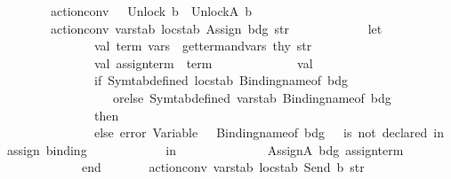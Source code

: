 \begin{isabellebody}
\ \ \ \ \ \ {\isacharbar}{\kern0pt}\ action{\isacharunderscore}{\kern0pt}conv\ {\isacharunderscore}{\kern0pt}\ {\isacharunderscore}{\kern0pt}\ {\isacharparenleft}{\kern0pt}Unlock\ b{\isacharparenright}{\kern0pt}\ {\isacharequal}{\kern0pt}\ UnlockA\ b\isanewline
\ \ \ \ \ \ {\isacharbar}{\kern0pt}\ action{\isacharunderscore}{\kern0pt}conv\ varstab\ locstab\ {\isacharparenleft}{\kern0pt}Assign\ {\isacharparenleft}{\kern0pt}bdg{\isacharcomma}{\kern0pt}\ str{\isacharparenright}{\kern0pt}{\isacharparenright}{\kern0pt}\ {\isacharequal}{\kern0pt}\isanewline
\ \ \ \ \ \ \ \ \ \ \ let\isanewline
\ \ \ \ \ \ \ \ \ \ \ \ \ \ val\ {\isacharparenleft}{\kern0pt}term{\isacharcomma}{\kern0pt}\ vars{\isacharparenright}{\kern0pt}\ {\isacharequal}{\kern0pt}\ get{\isacharunderscore}{\kern0pt}term{\isacharunderscore}{\kern0pt}and{\isacharunderscore}{\kern0pt}vars\ thy\ str\isanewline
\ \ \ \ \ \ \ \ \ \ \ \ \ \ val\ assign{\isacharunderscore}{\kern0pt}term\ {\isacharequal}{\kern0pt}\ term\isanewline
\ \ \ \ \ \ \ \ \ \ \ \ \ val\ {\isacharunderscore}{\kern0pt}\ {\isacharequal}{\kern0pt}\isanewline
\ \ \ \ \ \ \ \ \ \ \ \ \ \ if\ Symtab{\isachardot}{\kern0pt}defined\ locstab\ {\isacharparenleft}{\kern0pt}Binding{\isachardot}{\kern0pt}name{\isacharunderscore}{\kern0pt}of\ bdg{\isacharparenright}{\kern0pt}\ \isanewline
\ \ \ \ \ \ \ \ \ \ \ \ \ \ \ \ \ orelse\ Symtab{\isachardot}{\kern0pt}defined\ varstab\ {\isacharparenleft}{\kern0pt}Binding{\isachardot}{\kern0pt}name{\isacharunderscore}{\kern0pt}of\ bdg{\isacharparenright}{\kern0pt}\isanewline
\ \ \ \ \ \ \ \ \ \ \ \ \ \ then\ {\isacharparenleft}{\kern0pt}{\isacharparenright}{\kern0pt}\isanewline
\ \ \ \ \ \ \ \ \ \ \ \ \ \ else\ error\ {\isacharparenleft}{\kern0pt}{\isachardoublequote}{\kern0pt}Variable\ {\isachardoublequote}{\kern0pt}\ {\isacharcircum}{\kern0pt}\ {\isacharparenleft}{\kern0pt}Binding{\isachardot}{\kern0pt}name{\isacharunderscore}{\kern0pt}of\ bdg{\isacharparenright}{\kern0pt}\ {\isacharcircum}{\kern0pt}\ {\isachardoublequote}{\kern0pt}\ is\ not\ declared\ {\isacharparenleft}{\kern0pt}in\ assign\ binding{\isacharparenright}{\kern0pt}{\isachardoublequote}{\kern0pt}{\isacharparenright}{\kern0pt}\isanewline
\ \ \ \ \ \ \ \ \ \ \ \ in\isanewline
\ \ \ \ \ \ \ \ \ \ \ \ \ \ AssignA\ {\isacharparenleft}{\kern0pt}bdg{\isacharcomma}{\kern0pt}\ assign{\isacharunderscore}{\kern0pt}term{\isacharparenright}{\kern0pt}\isanewline
\ \ \ \ \ \ \ \ \ \ \ \ end\isanewline
\isanewline
\isanewline
\ \ \ \ \ \ {\isacharbar}{\kern0pt}\ action{\isacharunderscore}{\kern0pt}conv\ varstab\ locstab\ {\isacharparenleft}{\kern0pt}Send\ {\isacharparenleft}{\kern0pt}b{\isacharcomma}{\kern0pt}\ str{\isacharparenright}{\kern0pt}{\isacharparenright}{\kern0pt}\ {\isacharequal}{\kern0pt}\isanewline

\end{isabellebody}
